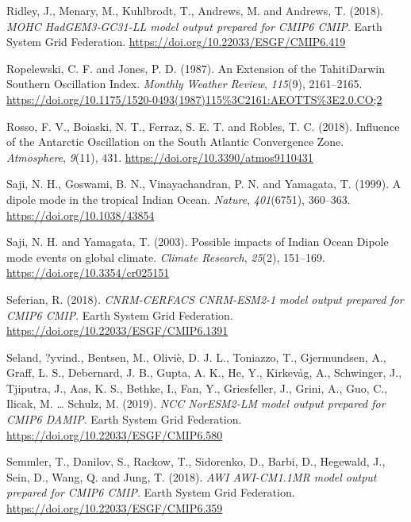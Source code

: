 \documentclass[12pt,oneside,a4paper]{reedthesis}
\newlength{\cslhangindent}
\newenvironment{CSLReferences}[2] %
 {%
  \setlength{\parindent}{0pt}
  \ifodd #1 \everypar{\setlength{\hangindent}{\cslhangindent}}\ignorespaces\fi
  \ifnum #2 > 0
  \setlength{\parskip}{#2\baselineskip}
  \fi
 }%
 {}
\begin{document}
\begin{CSLReferences}{1}{0}
\leavevmode{}%
Ridley, J., Menary, M., Kuhlbrodt, T., Andrews, M. and Andrews, T. (2018). \emph{MOHC HadGEM3-GC31-LL model output prepared for CMIP6 CMIP}. Earth System Grid Federation. \url{https://doi.org/10.22033/ESGF/CMIP6.419}

\leavevmode{}%
Ropelewski, C. F. and Jones, P. D. (1987). An {Extension} of the {Tahiti}{\textendash}{Darwin Southern Oscillation Index}. \emph{Monthly Weather Review}, \emph{115}(9), 2161--2165. \url{https://doi.org/10.1175/1520-0493(1987)115\%3C2161:AEOTTS\%3E2.0.CO;2}

\leavevmode{}%
Rosso, F. V., Boiaski, N. T., Ferraz, S. E. T. and Robles, T. C. (2018). Influence of the {Antarctic Oscillation} on the {South Atlantic Convergence Zone}. \emph{Atmosphere}, \emph{9}(11), 431. \url{https://doi.org/10.3390/atmos9110431}

\leavevmode{}%
Saji, N. H., Goswami, B. N., Vinayachandran, P. N. and Yamagata, T. (1999). A dipole mode in the tropical {Indian Ocean}. \emph{Nature}, \emph{401}(6751), 360--363. \url{https://doi.org/10.1038/43854}

\leavevmode{}%
Saji, N. H. and Yamagata, T. (2003). Possible impacts of {Indian Ocean Dipole} mode events on global climate. \emph{Climate Research}, \emph{25}(2), 151--169. \url{https://doi.org/10.3354/cr025151}

\leavevmode{}%
Seferian, R. (2018). \emph{CNRM-CERFACS CNRM-ESM2-1 model output prepared for CMIP6 CMIP}. Earth System Grid Federation. \url{https://doi.org/10.22033/ESGF/CMIP6.1391}

\leavevmode{}%
Seland, ?yvind., Bentsen, M., Oliviè, D. J. L., Toniazzo, T., Gjermundsen, A., Graff, L. S., Debernard, J. B., Gupta, A. K., He, Y., Kirkevåg, A., Schwinger, J., Tjiputra, J., Aas, K. S., Bethke, I., Fan, Y., Griesfeller, J., Grini, A., Guo, C., Ilicak, M. \ldots{} Schulz, M. (2019). \emph{NCC NorESM2-LM model output prepared for CMIP6 DAMIP}. Earth System Grid Federation. \url{https://doi.org/10.22033/ESGF/CMIP6.580}

\leavevmode{}%
Semmler, T., Danilov, S., Rackow, T., Sidorenko, D., Barbi, D., Hegewald, J., Sein, D., Wang, Q. and Jung, T. (2018). \emph{AWI AWI-CM1.1MR model output prepared for CMIP6 CMIP}. Earth System Grid Federation. \url{https://doi.org/10.22033/ESGF/CMIP6.359}


\end{CSLReferences}
\end{document}
